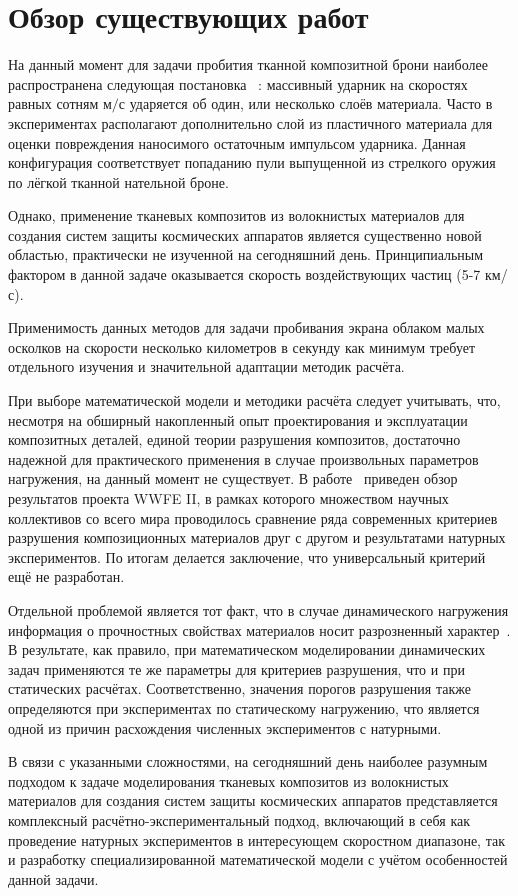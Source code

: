 \chapter{Обзор существующих работ}\label{ch:overview}

На данный момент для задачи пробития тканной композитной брони наиболее распространена следующая постановка
~\cite{kobylkin2014,kharchenko,walker1999,walker2001,porval,bkhatnagar}:
массивный ударник на скоростях равных сотням $м/с$ ударяется об один, или несколько слоёв материала.
Часто в экспериментах располагают дополнительно слой из пластичного материала для оценки повреждения наносимого
остаточным импульсом ударника.
Данная конфигурация соответствует попаданию пули выпущенной из стрелкого оружия по лёгкой тканной нательной броне.

Однако, применение тканевых композитов из волокнистых материалов для создания систем защиты космических аппаратов
является существенно новой областью, практически не изученной на сегодняшний день.
Принципиальным фактором в данной задаче оказывается скорость воздействующих частиц (5-7 км/с).

Применимость данных методов для задачи пробивания экрана облаком малых осколков на скорости несколько километров в
секунду как минимум  требует отдельного изучения и значительной адаптации методик расчёта.

При выборе математической модели и методики расчёта следует  учитывать, что, несмотря на обширный накопленный опыт
проектирования и  эксплуатации композитных деталей, единой теории разрушения композитов,  достаточно надежной для
практического применения в случае произвольных  параметров нагружения, на данный момент не существует.
В работе~\cite{kaddour} приведен обзор результатов проекта WWFE II, в рамках которого  множеством научных коллективов со всего
мира проводилось сравнение ряда  современных критериев разрушения композиционных материалов друг с  другом и результатами
натурных экспериментов.
По итогам делается  заключение, что универсальный критерий ещё не разработан.

Отдельной проблемой является тот факт, что в случае динамического  нагружения информация о прочностных свойствах
материалов носит разрозненный характер~\cite{kobylkin2014}.
В результате, как правило, при математическом моделировании динамических задач применяются те же параметры для
критериев разрушения, что и при статических расчётах.
Соответственно, значения порогов разрушения также определяются при экспериментах по  статическому нагружению, что
является одной из причин расхождения численных экспериментов с натурными.

В связи с указанными сложностями, на сегодняшний день наиболее разумным подходом к задаче моделирования тканевых
композитов из волокнистых материалов для создания систем защиты космических аппаратов представляется комплексный
расчётно-экспериментальный подход, включающий в себя как проведение натурных экспериментов в интересующем скоростном
диапазоне, так и разработку специализированной математической модели с учётом особенностей данной задачи.
